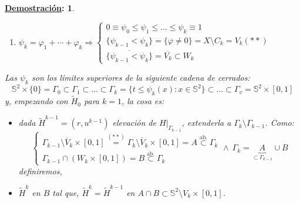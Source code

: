 \documentclass[10pt,a4paper,openright]{book}
\theoremstyle{break}
\newtheorem*{demo}{\underline{Demostración}:}
\begin{document}
\begin{demo}
\begin{enumerate}
\begin{enumerate}
        \item $\psi_k = \varphi_1 + \cdots + \varphi_k \Rightarrow \begin{cases}
            0 \equiv \psi_0 \le \psi_1 \le \ldots \le \psi_k \equiv 1\\
            \{\psi_{k - 1} < \psi_k\} = \{\varphi \neq 0\} = X \setminus C_k = V_k (**)\\
            \overline{\{\psi_{k - 1} < \psi_k\}} = \overline{V_k} \subset W_k
        \end{cases}$
    \end{enumerate}
    Las $\psi_k$ son los límites superiores de la siguiente cadena de cerrados:
    \[
    \mathbb{S}^{2} \times \{0\} = \Gamma_0 \subset \Gamma_1 \subset \ldots \subset \Gamma_k = \{t \le \psi_k\left( x \right) : x \in \mathbb{S}^{2}\} \subset  \ldots \subset \Gamma_v = \mathbb{S}^{2} \times \left[ 0, 1 \right] 
    \]
    y, empezando con $\tilde{H}_0$ para $k = 1$, la cosa es:
    \begin{itemize}
        \item dada $\tilde{H}^{k - 1} = \left( r, u^{k - 1} \right)$ elevación de $H|_{\Gamma_{k - 1}}$, extenderla a $\Gamma_k \setminus \Gamma_{k - 1}$. Como:
        \[
        \begin{cases}
            \Gamma_{k - 1} \setminus \overline{V}_k \times \left[ 0, 1 \right] \stackrel{(**)}{=} \Gamma_k \setminus \overline{V}_k \times \left[ 0, 1 \right] = A \stackrel{\text{ab.}}{\subset} \Gamma_k\\
            \Gamma_{k - 1} \cap \left( W_k \times \left[ 0, 1 \right] \right) = B \stackrel{\text{ab.}}{\subset} \Gamma_k
        \end{cases}\land\ \Gamma_k = \underbrace{A}_{\subset \Gamma_{k - 1}} \cup B
        \]
        definiremos,
        \item $\tilde{H}^k$ en $B$ tal que, $\tilde{H}^k = \tilde{H}^{k - 1}$ en $A \cap B \subset \mathbb{S}^{2} \setminus V_k \times \left[ 0, 1 \right]$.
    \end{itemize}


\end{enumerate}
\end{demo}
\end{document}
